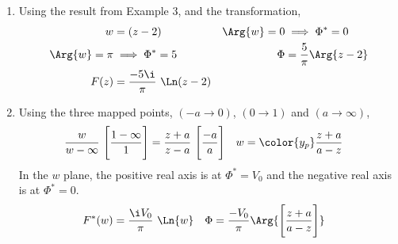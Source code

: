 \begin{enumerate}
    \item Using the result from Example $ 3 $, and the transformation,
          \begin{align}
              w             & = (z-2)                       &
              \Arg{w} = 0   & \implies \Phi^* = 0             \\
              \Arg{w} = \pi & \implies \Phi^* = 5           &
              \Phi          & = \frac{5}{\pi} \Arg{z-2}       \\
              F(z)          & = \frac{-5 \i}{\pi}\ \Ln(z-2)
          \end{align}

    \item Using the three mapped points, $ (-a \to 0) $, $ (0 \to 1) $
          and $ (a \to \infty) $,
          \begin{align}
              \frac{w}{w - \infty}\ \Bigg[ \frac{1 - \infty}{1} \Bigg] & =
              \frac{z + a}{z - a}\ \Bigg[ \frac{-a}{a}
              \Bigg]                                                   &
              w                                                        & = \color{y_p}
              \frac{z + a}{a - z}
          \end{align}
          In the $ w $ plane, the positive real axis is at $ \Phi^* = V_0 $ and the
          negative real axis is at $ \Phi^* = 0 $.
          \begin{align}
              F^*(w) & = \frac{\i V_0}{\pi}\ \Ln{w}                         &
              \Phi   & = \frac{-V_0}{\pi} \Arg{\Bigg[\frac{z+a}{a-z}\Bigg]}
          \end{align}

\end{enumerate}